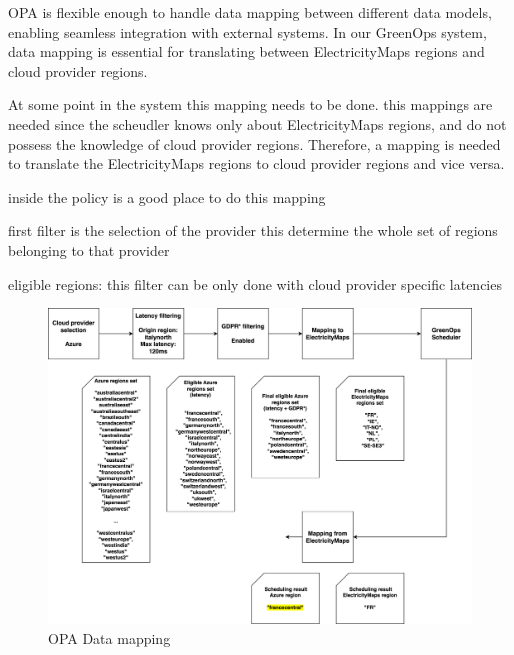 OPA is flexible enough to handle data mapping between different data models, enabling seamless integration with external systems. In our GreenOps system, data mapping is essential for translating between ElectricityMaps regions and cloud provider regions. 


At some point in the system this mapping needs to be done.
this mappings are needed since the scheudler knows only about ElectricityMaps regions, and do not possess the knowledge of cloud provider regions. Therefore, a mapping is needed to translate the ElectricityMaps regions to cloud provider regions and vice versa.

inside the policy is a good place to do this mapping


first filter is the selection of the provider
this determine the whole set of regions belonging to that provider

eligible regions: this filter can be only done with cloud provider specific latencies

\begin{figure}[H]
  \centering
  \includegraphics[width=1\linewidth]{images/data_mapping.png}
  \caption{OPA Data mapping}
  \label{fig:data_mapping}
\end{figure}


